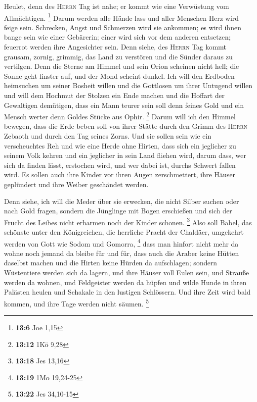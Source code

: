  Heulet, denn des \textsc{Herrn} Tag ist nahe; er kommt
wie eine Verwüstung vom Allmächtigen. \footnote{\textbf{13:6} Joe 1,15}
 Darum werden alle Hände lass und aller Menschen Herz wird
feige sein.  Schrecken, Angst und Schmerzen wird sie
ankommen; es wird ihnen bange sein wie einer Gebärerin; einer wird sich
vor dem anderen entsetzen; feuerrot werden ihre Angesichter sein.
 Denn siehe, des \textsc{Herrn} Tag kommt grausam, zornig,
grimmig, das Land zu verstören und die Sünder daraus zu vertilgen.
 Denn die Sterne am Himmel und sein Orion scheinen nicht
hell; die Sonne geht finster auf, und der Mond scheint dunkel.
 Ich will den Erdboden heimsuchen um seiner Bosheit
willen und die Gottlosen um ihrer Untugend willen und will dem Hochmut
der Stolzen ein Ende machen und die Hoffart der Gewaltigen demütigen,
 dass ein Mann teurer sein soll denn feines Gold und ein
Mensch werter denn Goldes Stücke aus Ophir. \footnote{\textbf{13:12} 1Kö
  9,28}  Darum will ich den Himmel bewegen, dass die Erde
beben soll von ihrer Stätte durch den Grimm des \textsc{Herrn} Zebaoth
und durch den Tag seines Zorns.  Und sie sollen sein wie
ein verscheuchtes Reh und wie eine Herde ohne Hirten, dass sich ein
jeglicher zu seinem Volk kehren und ein jeglicher in sein Land fliehen
wird,  darum dass, wer sich da finden lässt, erstochen
wird, und wer dabei ist, durchs Schwert fallen wird.  Es
sollen auch ihre Kinder vor ihren Augen zerschmettert, ihre Häuser
geplündert und ihre Weiber geschändet werden.

 Denn siehe, ich will die Meder über sie erwecken, die
nicht Silber suchen oder nach Gold fragen,  sondern die
Jünglinge mit Bogen erschießen und sich der Frucht des Leibes nicht
erbarmen noch der Kinder schonen. \footnote{\textbf{13:18} Jes 13,16}
 Also soll Babel, das schönste unter den Königreichen,
die herrliche Pracht der Chaldäer, umgekehrt werden von Gott wie Sodom
und Gomorra, \footnote{\textbf{13:19} 1Mo 19,24-25}  dass
man hinfort nicht mehr da wohne noch jemand da bleibe für und für, dass
auch die Araber keine Hütten daselbst machen und die Hirten keine Hürden
da aufschlagen;  sondern Wüstentiere werden sich da
lagern, und ihre Häuser voll Eulen sein, und Strauße werden da wohnen,
und Feldgeister werden da hüpfen  und wilde Hunde in
ihren Palästen heulen und Schakale in den lustigen Schlössern. Und ihre
Zeit wird bald kommen, und ihre Tage werden nicht säumen. \footnote{\textbf{13:22}
  Jes 34,10-15}

